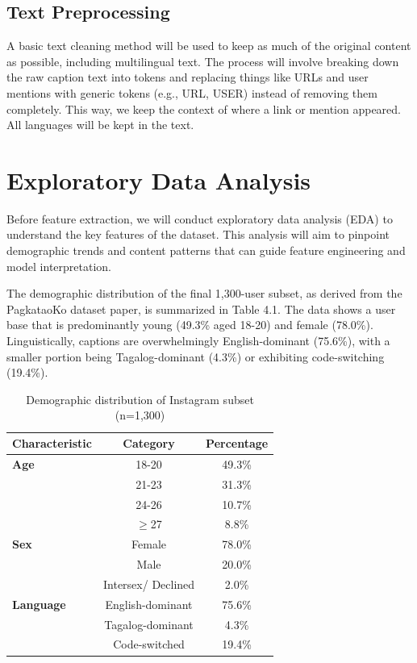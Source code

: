 \subsection{Text Preprocessing}
A basic text cleaning method will be used to keep as much of the original content as possible, including multilingual text. The process will involve breaking down the raw caption text into tokens and replacing things like URLs and user mentions with generic tokens (e.g., URL, USER) instead of removing them completely. This way, we keep the context of where a link or mention appeared. All languages will be kept in the text.


\section{Exploratory Data Analysis}
\label{subsec:eda}

Before feature extraction, we will conduct exploratory data analysis (EDA) to understand the key features of the dataset. This analysis will aim to pinpoint demographic trends and content patterns that can guide feature engineering and model interpretation.

The demographic distribution of the final 1,300-user subset, as derived from the PagkataoKo dataset paper, is summarized in Table 4.1. The data shows a user base that is predominantly young (49.3\% aged 18-20) and female (78.0\%). Linguistically, captions are overwhelmingly English-dominant (75.6\%), with a smaller portion being Tagalog-dominant (4.3\%) or exhibiting code-switching (19.4\%).

\begin{table}[h]
	\centering
	\caption{Demographic distribution of Instagram subset (n=1,300)}
	\label{tab:demo}
	\begin{tabular}{lcc}
		\hline
		\textbf{Characteristic} & \textbf{Category} & \textbf{Percentage} \\ \hline
		\textbf{Age} & 18-20 & 49.3\% \\
		& 21-23 & 31.3\% \\
		& 24-26 & 10.7\% \\
		& $\geq$27 & 8.8\% \\ \hline
		\textbf{Sex} & Female & 78.0\% \\
		& Male & 20.0\% \\
		& Intersex/ Declined & 2.0\% \\ \hline
		\textbf{Language} & English-dominant & 75.6\% \\
		& Tagalog-dominant & 4.3\% \\
		& Code-switched & 19.4\% \\ \hline
	\end{tabular}
\end{table}

